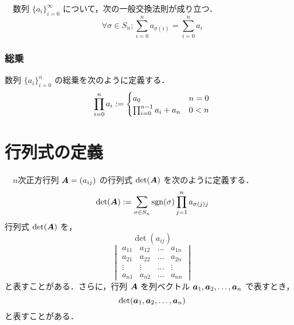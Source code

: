 \documentclass[leqno,autodetect-engine,dvipdfmx-if-dvi,ja=standard,a4paper,12pt]{bxjsbook}
\begin{document}
					\begin{thm}[交換法則]　数列 $\{a_i\}_{i=0}^{\infty}$ について，次の一般交換法則が成り立つ．
						\begin{equation}
							\forall \sigma \in S_n ; \sum_{i=0}^{n} a_{\sigma(i)}  = \sum_{i=0}^{n} a_i
						\end{equation} 
					\end{thm}
					\subsubsection{総乗}
					\begin{dfn} 数列 $\{a_i\}_{i=0}^{n}$ の総乗を次のように定義する．
						\begin{equation}
							\prod_{i=0}^{n} a_i := \begin{cases}
								a_0 & n = 0 \\
								\prod_{i=0}^{n-1} a_i + a_{n} &  0 < n
							\end{cases}
						\end{equation}
					\end{dfn}

			\section{行列式の定義}
				\begin{dfn}[行列式]　$n$次正方行列 $\boldsymbol{A}=(a_{i j})$ の行列式 $\det(\boldsymbol{A})$ を次のように定義する．
					\begin{equation}
						\det(\boldsymbol{A}) := \sum_{\sigma \in S_n} \operatorname{\mathrm{sgn}}(\sigma) \prod_{j=1}^{n} a_{\sigma(j) j}
					\end{equation}
					行列式 $\det(\boldsymbol{A})$ を，
					\begin{equation}
						\det(a_{i j})
					\end{equation}
					\begin{equation}
						\begin{vmatrix}
							a_{1 1} & a_{1 2} & \dots & a_{1 n} \\
							a_{2 1} & a_{2 2} & \dots & a_{2 n} \\
							\vdots & \vdots & \dots & \vdots \\
							a_{n 1} & a_{n 2} & \dots & a_{n n}
						\end{vmatrix}
					\end{equation}
					と表すことがある．さらに，行列 $\boldsymbol{A}$ を列ベクトル $\boldsymbol{a}_1,\boldsymbol{a}_2,\dots,\boldsymbol{a}_n$ で表すとき，
					\begin{equation}
						\det({\boldsymbol{a}_1,\boldsymbol{a}_2,\dots,\boldsymbol{a}_n})
					\end{equation}
					と表すことがある．
				\end{dfn}
			
\end{document}
